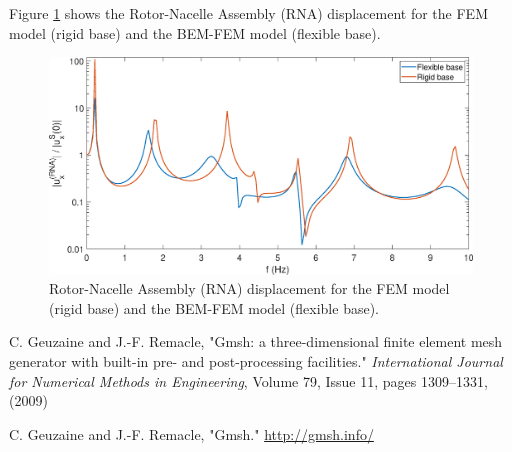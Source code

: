 \documentclass[a4]{article}
\begin{document}
Figure \ref{fig:results} shows the Rotor-Nacelle Assembly (RNA) displacement for the FEM model (rigid base) and the BEM-FEM model (flexible base).

\begin{figure}[tbh!]
	\centering
	\includegraphics[scale=0.5]{wind_turbine.eps}
	\caption{Rotor-Nacelle Assembly (RNA) displacement for the FEM model (rigid base) and the BEM-FEM model (flexible base).}
	\label{fig:results}
\end{figure}

\FloatBarrier

\begin{thebibliography}{99}
	
	 C. Geuzaine and J.-F. Remacle, "Gmsh: a three-dimensional finite element mesh generator with built-in pre- and post-processing facilities." \emph{International Journal for Numerical Methods in Engineering}, Volume 79, Issue 11, pages 1309--1331, (2009)
	
	 C. Geuzaine and J.-F. Remacle, "Gmsh." \url{http://gmsh.info/}

\end{thebibliography}
\end{document}
